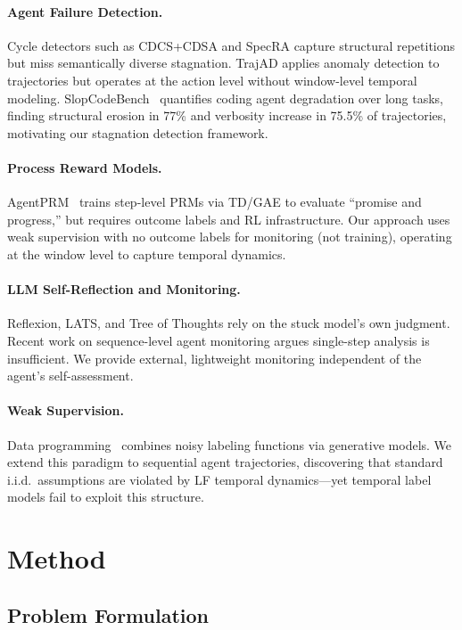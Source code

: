 \documentclass[11pt,a4paper]{article}
\begin{document}
\paragraph{Agent Failure Detection.}
Cycle detectors such as CDCS+CDSA and SpecRA capture structural repetitions but miss semantically diverse stagnation. TrajAD applies anomaly detection to trajectories but operates at the action level without window-level temporal modeling. SlopCodeBench~\cite{slopcodeench2026} quantifies coding agent degradation over long tasks, finding structural erosion in 77\% and verbosity increase in 75.5\% of trajectories, motivating our stagnation detection framework.

\paragraph{Process Reward Models.}
AgentPRM~\cite{xi2026agentprm} trains step-level PRMs via TD/GAE to evaluate ``promise and progress,'' but requires outcome labels and RL infrastructure. Our approach uses weak supervision with no outcome labels for monitoring (not training), operating at the window level to capture temporal dynamics.

\paragraph{LLM Self-Reflection and Monitoring.}
Reflexion, LATS, and Tree of Thoughts rely on the stuck model's own judgment. Recent work on sequence-level agent monitoring argues single-step analysis is insufficient. We provide external, lightweight monitoring independent of the agent's self-assessment.

\paragraph{Weak Supervision.}
Data programming~\cite{ratner2017snorkel} combines noisy labeling functions via generative models. We extend this paradigm to sequential agent trajectories, discovering that standard i.i.d.\ assumptions are violated by LF temporal dynamics---yet temporal label models fail to exploit this structure.

\section{Method}
\label{sec:method}

\subsection{Problem Formulation}
\end{document}
